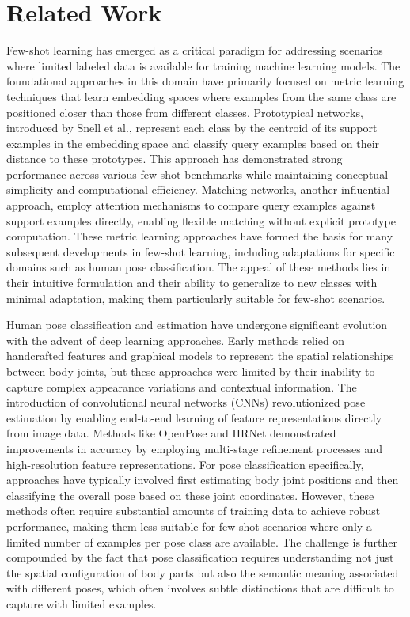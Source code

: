 \documentclass[11pt]{article}
\begin{document}
\section{Related Work}

Few-shot learning has emerged as a critical paradigm for addressing scenarios where limited labeled data is available for training machine learning models. The foundational approaches in this domain have primarily focused on metric learning techniques that learn embedding spaces where examples from the same class are positioned closer than those from different classes. Prototypical networks, introduced by Snell et al., represent each class by the centroid of its support examples in the embedding space and classify query examples based on their distance to these prototypes. This approach has demonstrated strong performance across various few-shot benchmarks while maintaining conceptual simplicity and computational efficiency. Matching networks, another influential approach, employ attention mechanisms to compare query examples against support examples directly, enabling flexible matching without explicit prototype computation. These metric learning approaches have formed the basis for many subsequent developments in few-shot learning, including adaptations for specific domains such as human pose classification. The appeal of these methods lies in their intuitive formulation and their ability to generalize to new classes with minimal adaptation, making them particularly suitable for few-shot scenarios.

Human pose classification and estimation have undergone significant evolution with the advent of deep learning approaches. Early methods relied on handcrafted features and graphical models to represent the spatial relationships between body joints, but these approaches were limited by their inability to capture complex appearance variations and contextual information. The introduction of convolutional neural networks (CNNs) revolutionized pose estimation by enabling end-to-end learning of feature representations directly from image data. Methods like OpenPose and HRNet demonstrated improvements in accuracy by employing multi-stage refinement processes and high-resolution feature representations. For pose classification specifically, approaches have typically involved first estimating body joint positions and then classifying the overall pose based on these joint coordinates. However, these methods often require substantial amounts of training data to achieve robust performance, making them less suitable for few-shot scenarios where only a limited number of examples per pose class are available. The challenge is further compounded by the fact that pose classification requires understanding not just the spatial configuration of body parts but also the semantic meaning associated with different poses, which often involves subtle distinctions that are difficult to capture with limited examples.
\end{document}
